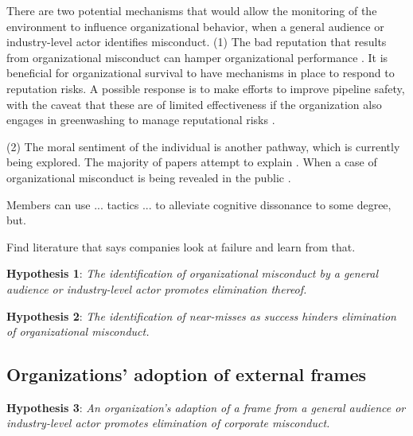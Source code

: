 There are two potential mechanisms that would allow the monitoring of the environment to influence organizational behavior, when a general audience or industry-level actor identifies misconduct. (1) The bad reputation that results from organizational misconduct can hamper organizational performance \citep{Park2019}. It is beneficial for organizational survival to have mechanisms in place to respond to reputation risks. A possible response is to make efforts to improve pipeline safety, with the caveat that these are of limited effectiveness if the organization also engages in greenwashing to manage reputational risks \citep{Kim2015, Lyon2015}.

(2) The moral sentiment of the individual is another pathway, which is currently being explored. The majority of papers attempt to explain . When a case of organizational misconduct is being revealed in the public .

Members can use ... tactics ... to alleviate cognitive dissonance to some degree, but.

Find literature that says companies look at failure and learn from that.

\textbf{Hypothesis 1}: \textit{The identification of organizational misconduct by a general audience or industry-level actor promotes elimination thereof.}

\textbf{Hypothesis 2}: \textit{The identification of near-misses as success hinders elimination of organizational misconduct.}

\subsection{Organizations' adoption of external frames}

\textbf{Hypothesis 3}: \textit{An organization's adaption of a frame from a general audience or industry-level actor promotes elimination of corporate misconduct.}